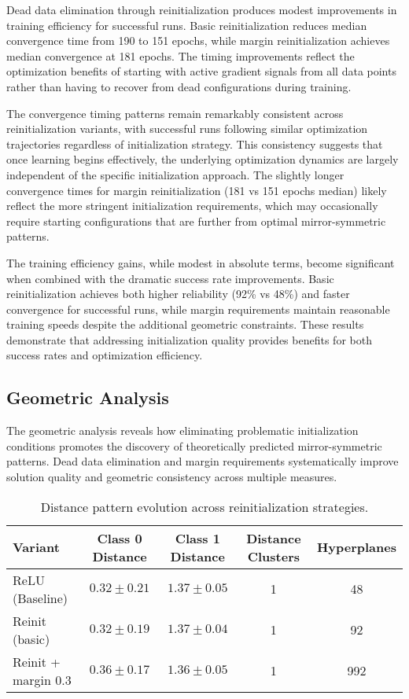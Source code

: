 Dead data elimination through reinitialization produces modest improvements in training efficiency for successful runs. Basic reinitialization reduces median convergence time from 190 to 151 epochs, while margin reinitialization achieves median convergence at 181 epochs. The timing improvements reflect the optimization benefits of starting with active gradient signals from all data points rather than having to recover from dead configurations during training.

The convergence timing patterns remain remarkably consistent across reinitialization variants, with successful runs following similar optimization trajectories regardless of initialization strategy. This consistency suggests that once learning begins effectively, the underlying optimization dynamics are largely independent of the specific initialization approach. The slightly longer convergence times for margin reinitialization (181 vs 151 epochs median) likely reflect the more stringent initialization requirements, which may occasionally require starting configurations that are further from optimal mirror-symmetric patterns.

The training efficiency gains, while modest in absolute terms, become significant when combined with the dramatic success rate improvements. Basic reinitialization achieves both higher reliability (92\% vs 48\%) and faster convergence for successful runs, while margin requirements maintain reasonable training speeds despite the additional geometric constraints. These results demonstrate that addressing initialization quality provides benefits for both success rates and optimization efficiency.


\subsection*{Geometric Analysis}

The geometric analysis reveals how eliminating problematic initialization conditions promotes the discovery of theoretically predicted mirror-symmetric patterns. Dead data elimination and margin requirements systematically improve solution quality and geometric consistency across multiple measures.

\begin{table}[ht]
\centering
\caption{Distance pattern evolution across reinitialization strategies.}
\label{tab:relu1-reinit-distance}
\begin{tabular}{lcccc}
\toprule
Variant & Class 0 Distance & Class 1 Distance & Distance Clusters & Hyperplanes \\
\midrule
ReLU (Baseline) & $0.32 \pm 0.21$ & $1.37 \pm 0.05$ & 1 & 48 \\
Reinit (basic) & $0.32 \pm 0.19$ & $1.37 \pm 0.04$ & 1 & 92 \\
Reinit + margin 0.3 & $0.36 \pm 0.17$ & $1.36 \pm 0.05$ & 1 & 992 \\
\bottomrule
\end{tabular}
\end{table}

